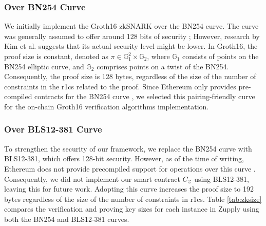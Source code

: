 \subsubsection{Over BN254 Curve}
We initially implement the Groth16 zkSNARK over the BN254 curve. The curve was generally assumed to offer around 128 bits of security \cite{BNcurve}; However, research by Kim et al. \cite{Kim2015Extended} suggests that its actual security level might be lower. In Groth16, the proof size is constant, denoted as \(\pi \in \mathbb{G}_1^2 \times \mathbb{G}_2\), where \(\mathbb{G}_1\) consists of points on the BN254 elliptic curve, and \(\mathbb{G}_2\) comprises points on a twist of the BN254. Consequently, the proof size is 128 bytes, regardless of the size of the number of constraints in the \gls{r1cs} related to the proof.
Since Ethereum only provides pre-compiled contracts for the BN254 curve \cite{EIP197, Housni2022Families}, we selected this pairing-friendly curve for the on-chain Groth16 verification algorithms implementation. 

\subsubsection{Over BLS12-381 Curve}
To strengthen the security of our framework, we replace the BN254 curve with BLS12-381, which offers 128-bit security. However, as of the time of writing, Ethereum does not provide precompiled support for operations over this curve \cite{Vlasov2020}. Consequently, we did not implement our smart contract $C_\mathcal{Z}$ using BLS12-381, leaving this for future work. Adopting this curve increases the proof size to 192 bytes regardless of the size of the number of constraints in  \gls{r1cs}. Table \ref{tab:zksize} compares the verification and proving key sizes for each instance in Zupply using both the BN254 and BLS12-381 curves.

